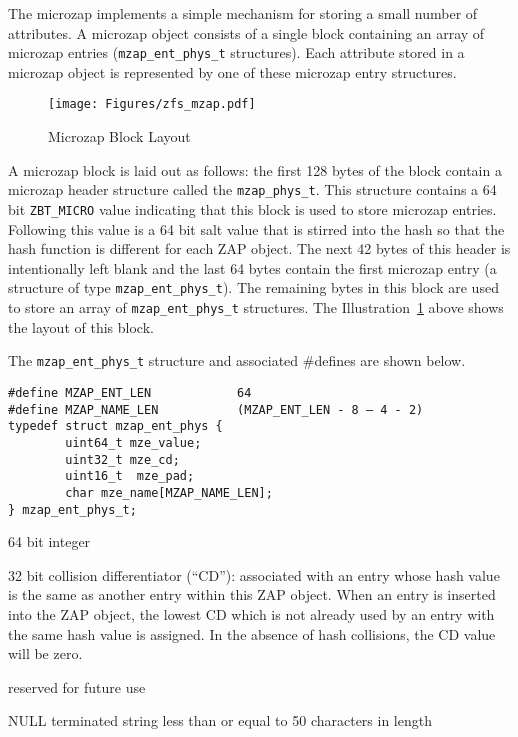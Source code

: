 The microzap implements a simple mechanism for storing a small number of attributes.
A microzap object consists of a single block
containing an array of microzap entries (\lstinline{mzap_ent_phys_t} structures).
Each attribute stored in a microzap object is represented
by one of these microzap entry structures.

\begin{figure}[ht]
  \centering
  \texttt{[image: Figures/zfs\_mzap.pdf]}
  \caption{Microzap Block Layout}
  \label{fig:mzap}
\end{figure}

A microzap block is laid out as follows:
the first 128 bytes of the block contain
a microzap header structure called the \lstinline{mzap_phys_t}.
This structure contains a 64 bit \lstinline{ZBT_MICRO} value
indicating that this block is used to store microzap entries.
Following this value is a 64 bit salt value
that is stirred into the hash so that the hash function is different for each ZAP object.
The next 42 bytes of this header is intentionally left blank
and the last 64 bytes contain the first microzap entry
(a structure of type \lstinline{mzap_ent_phys_t}).
The remaining bytes in this block are used to
store an array of \lstinline{mzap_ent_phys_t} structures.
The Illustration~\ref{fig:mzap} above shows the layout of this block.

The \lstinline{mzap_ent_phys_t} structure and associated \#defines are shown below.

\begin{lstlisting}[style=c]
#define MZAP_ENT_LEN            64
#define MZAP_NAME_LEN           (MZAP_ENT_LEN - 8 – 4 - 2)
typedef struct mzap_ent_phys {
        uint64_t mze_value;
        uint32_t mze_cd;
        uint16_t  mze_pad;
        char mze_name[MZAP_NAME_LEN];
} mzap_ent_phys_t;
\end{lstlisting}

\begin{flushright}
  \begin{minipage}[c]{.92\textwidth}
    \begin{description}[style=standard]
    \item[mze\_value:]  64 bit integer
    \item[mze\_cd:]
      32 bit collision differentiator (``CD''):
      associated with an entry whose hash value is the same as another entry within this ZAP object.
      When an entry is inserted into the ZAP object,
      the lowest CD which is not already used by an entry with the same hash value is assigned.
      In the absence of hash collisions,
      the CD value will be zero.
    \item[mze\_pad:]
      reserved for future use
    \item[mze\_name:]
      NULL terminated string less than or equal to 50 characters in length
    \end{description}
  \end{minipage}
\end{flushright}

